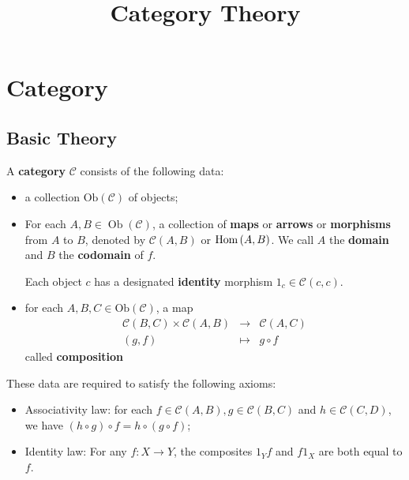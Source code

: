 \documentclass[12pt, oneside]{book}
\begin{document}
\frontmatter
\title{{\Huge{\textbf{Category Theory}}}}
\maketitle
{}
\tableofcontents %


\mainmatter
{} %



\chapter{Category} %
\section{Basic Theory} %
\begin{definition}
    A \textbf{category} $\mathcal{C}$ consists of the following data:
    \begin{itemize}
        \item
              a collection $\mathrm{Ob}(\mathcal{C})$ of objects;
        \item
              For each $A, B \in \operatorname{Ob}(\mathcal{C})$, a collection of \textbf{maps} or \textbf{arrows} or \textbf{morphisms} from $A$ to $B$, denoted by $\mathcal{C}(A, B)$ or $\operatorname{\operatorname{Hom}}\left(A,B\right)$.
              We call $A$ the \textbf{domain} and $B$ the \textbf{codomain} of $f$.


              Each object $c$ has a designated \textbf{identity} morphism $1_c \in \mathcal{C}(c, c)$.
        \item
              for each $A, B, C \in \mathrm{Ob}(\mathcal{C})$, a map
              \begin{equation*}
                  \begin{array}{ccc}
                      \mathcal{C}(B, C) \times \mathcal{C}(A, B) & \rightarrow & \mathcal{C}(A, C) \\
                      (g, f)                                     & \mapsto     & g \circ f
                  \end{array}
              \end{equation*}
              called \textbf{composition}
    \end{itemize}
    These data are required to satisfy the following axioms:
    \begin{itemize}
        \item
              Associativity law: for each $f \in \mathcal{C}(A, B), g \in \mathcal{C}(B, C)$ and $h \in \mathcal{C}(C, D)$, we have $(h \circ g) \circ f=h \circ(g \circ f)$;
        \item
              Identity law: For any $f : X \rightarrow Y$, the composites $1_Y f$ and $f 1_X$ are both equal to $f$.
    \end{itemize}
\end{definition}
\end{document}
